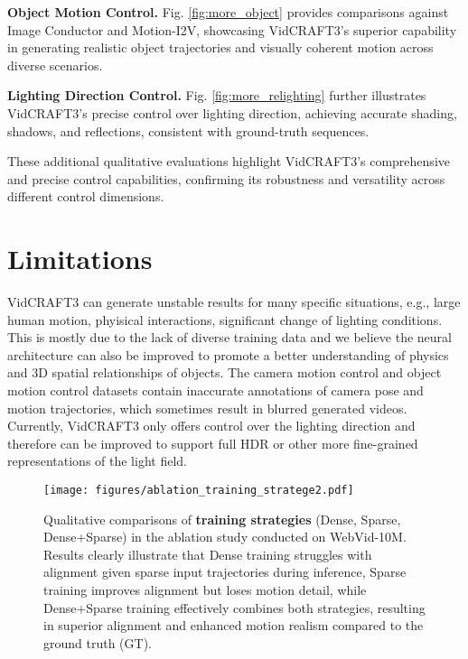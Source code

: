 \noindent\textbf{Object Motion Control.}
Fig. \ref{fig:more_object} provides comparisons against Image Conductor and Motion-I2V, showcasing VidCRAFT3's superior capability in generating realistic object trajectories and visually coherent motion across diverse scenarios.

\noindent\textbf{Lighting Direction Control.}
Fig. \ref{fig:more_relighting} further illustrates VidCRAFT3's precise control over lighting direction, achieving accurate shading, shadows, and reflections, consistent with ground-truth sequences.

These additional qualitative evaluations highlight VidCRAFT3's comprehensive and precise control capabilities, confirming its robustness and versatility across different control dimensions.




\section{Limitations}

VidCRAFT3 can generate unstable results for many specific situations, e.g., large human motion, phyisical interactions, significant change of lighting conditions. This is mostly due to the lack of diverse training data and we believe the neural architecture can also be improved to promote a better understanding of physics and 3D spatial relationships of objects. The camera motion control and object motion control datasets contain inaccurate annotations of camera pose and motion trajectories, which sometimes result in blurred generated videos. Currently, VidCRAFT3 only offers control over the lighting direction and therefore can be improved to support full HDR or other more fine-grained representations of the light field. 


\begin{figure*}
    \centering
    \texttt{[image: figures/ablation\_training\_stratege2.pdf]}
    \caption{
    Qualitative comparisons of \textbf{training strategies} (Dense, Sparse, Dense+Sparse) in the ablation study conducted on WebVid-10M. Results clearly illustrate that Dense training struggles with alignment given sparse input trajectories during inference, Sparse training improves alignment but loses motion detail, while Dense+Sparse training effectively combines both strategies, resulting in superior alignment and enhanced motion realism compared to the ground truth (GT).
    }
    \label{fig:qual_res_ablation_training_strategy}
\end{figure*}


